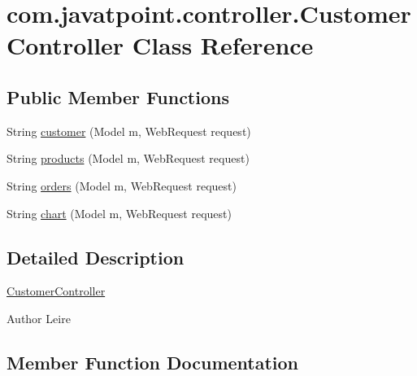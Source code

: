 \hypertarget{classcom_1_1javatpoint_1_1controller_1_1_customer_controller}{}\section{com.\+javatpoint.\+controller.\+Customer\+Controller Class Reference}
\label{classcom_1_1javatpoint_1_1controller_1_1_customer_controller}
\subsection*{Public Member Functions}
\begin{DoxyCompactItemize}
\item 
String \mbox{\hyperlink{classcom_1_1javatpoint_1_1controller_1_1_customer_controller_abc22201834c6bb6454b342c3480889ee}{customer}} (Model m, Web\+Request request)
\item 
String \mbox{\hyperlink{classcom_1_1javatpoint_1_1controller_1_1_customer_controller_a5d32bdd124f745fc2ad718610786f638}{products}} (Model m, Web\+Request request)
\item 
String \mbox{\hyperlink{classcom_1_1javatpoint_1_1controller_1_1_customer_controller_a3c292bc700f19ca6900fba60d72dfc9e}{orders}} (Model m, Web\+Request request)
\item 
String \mbox{\hyperlink{classcom_1_1javatpoint_1_1controller_1_1_customer_controller_aaaf47881b1ef74fc533def63e99f4fe1}{chart}} (Model m, Web\+Request request)
\end{DoxyCompactItemize}


\subsection{Detailed Description}
\mbox{\hyperlink{classcom_1_1javatpoint_1_1controller_1_1_customer_controller}{Customer\+Controller}} \begin{DoxyAuthor}{Author}
Leire 
\end{DoxyAuthor}


\subsection{Member Function Documentation}
\mbox{\label{classcom_1_1javatpoint_1_1controller_1_1_customer_controller_aaaf47881b1ef74fc533def63e99f4fe1}} 
